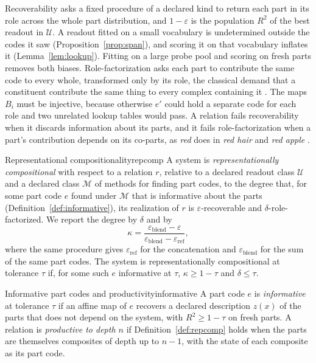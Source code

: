 \documentclass[10pt]{article}
\theoremstyle{plain}
\theoremstyle{remark}
\newcommand{\U}{\mathcal{U}}
\newcommand{\M}{\mathcal{M}}
\begin{document}
Recoverability asks a fixed procedure of a declared kind to return each part in its role across the whole part distribution, and $1 - \varepsilon$ is the population $R^2$ of the best readout in $\U$. A readout fitted on a small vocabulary is undetermined outside the codes it saw (Proposition~\ref{prop:span}), and scoring it on that vocabulary inflates it (Lemma~\ref{lem:lookup}). Fitting on a large probe pool and scoring on fresh parts removes both biases. Role-factorization asks each part to contribute the same code to every whole, transformed only by its role, the classical demand that a constituent contribute the same thing to every complex containing it \citep{fodor1988}. The maps $B_i$ must be injective, because otherwise $e'$ could hold a separate code for each role and two unrelated lookup tables would pass. A relation fails recoverability when it discards information about its parts, and it fails role-factorization when a part's contribution depends on its co-parts, as \emph{red} does in \emph{red hair} and \emph{red apple} \citep{kamp1995}.

\begin{defbox}{Representational compositionality}{repcomp}
A system is \emph{representationally compositional} with respect to a relation $r$, relative to a declared readout class $\U$ and a declared class $\M$ of methods for finding part codes, to the degree that, for some part code $e$ found under $\M$ that is informative about the parts (Definition~\ref{def:informative}), its realization of $r$ is $\varepsilon$-recoverable and $\delta$-role-factorized. We report the degree by $\delta$ and by
\begin{equation}
  \kappa = \frac{\varepsilon_{\mathrm{blend}} - \varepsilon}{\varepsilon_{\mathrm{blend}} - \varepsilon_{\mathrm{ref}}},
  \label{eq:kappa}
\end{equation}
where the same procedure gives $\varepsilon_{\mathrm{ref}}$ for the concatenation and $\varepsilon_{\mathrm{blend}}$ for the sum of the same part codes. The system is representationally compositional at tolerance $\tau$ if, for some such $e$ informative at $\tau$, $\kappa \ge 1 - \tau$ and $\delta \le \tau$.
\end{defbox}

\begin{defbox}{Informative part codes and productivity}{informative}
A part code $e$ is \emph{informative} at tolerance $\tau$ if an affine map of $e$ recovers a declared description $z(x)$ of the parts that does not depend on the system, with $R^2 \ge 1 - \tau$ on fresh parts. A relation is \emph{productive to depth $n$} if Definition~\ref{def:repcomp} holds when the parts are themselves composites of depth up to $n - 1$, with the state of each composite as its part code.
\end{defbox}
\end{document}
